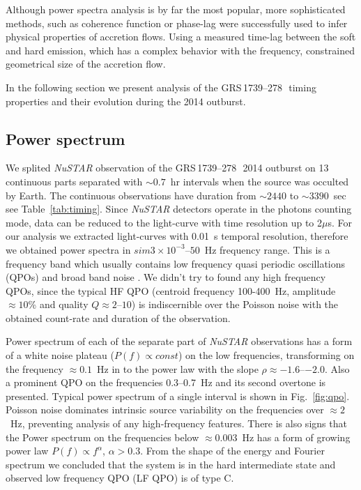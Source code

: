 \documentclass[a4paper,fleqn,usenatbib]{mnras}
\def\grs{{GRS\,1739--278\,}}
\begin{document}
Although power spectra analysis is by far the most popular, more sophisticated methods, such as coherence function or phase-lag were successfully used to infer physical properties of accretion flows. 
Using a measured time-lag between the soft and hard emission, which has a complex behavior with the frequency, \cite{1999ApJ...517..355N} constrained geometrical size of the accretion flow. 


In the following section we present analysis of the \grs\ timing properties and their evolution during the 2014 outburst.

\subsection{Power spectrum}

We splited {\it NuSTAR} observation of the \grs\ 2014 outburst on 13 continuous parts separated with $\sim0.7$~hr intervals when the source was occulted by Earth. 
The continuous observations have duration from $\sim2440$ to $\sim3390$~sec see Table~\ref{tab:timing}.
Since {\it NuSTAR} detectors operate in the photons counting mode, data can be reduced to the light-curve with time resolution up to 2$\mu$s.
For our analysis we extracted light-curves with 0.01~s temporal resolution, therefore we obtained power spectra in $sim3\times10^{-3}$--$50$~Hz frequency range.
This is a frequency band which usually contains low frequency quasi periodic oscillations (QPOs) and broad band noise \citep{1999ApJ...514..939W}.
We didn't try to found any high frequency QPOs, since the typical HF QPO (centroid frequency 100-400~Hz, amplitude $\approx10$\% and quality $Q\approx2$--$10$) is indiscernible over the Poisson noise with the obtained count-rate and duration of the observation.

Power spectrum of each of the separate part of {\it NuSTAR} observations has a form of a white noise plateau ($P(f)\propto const$) on the low frequencies, transforming on the frequency $\approx0.1$~Hz in to the power law with the slope $\rho\approx-1.6$--$-2.0$. 
Also a prominent QPO on the frequencies 0.3--0.7~Hz and its second overtone is presented. 
Typical power spectrum of a single interval is shown in Fig.~\ref{fig:qpo}.
Poisson noise dominates intrinsic source variability on the frequencies over $\approx2$~Hz, preventing analysis of any high-frequency features.
There is also signs that the Power spectrum on the frequencies below $\approx0.003$~Hz has a form of growing power law $P(f)\propto f^{\alpha}$, $\alpha > 0.3$.
From the shape of the energy and Fourier spectrum we concluded that the system is in the hard intermediate state and observed low frequency QPO (LF QPO) is of type C. 
\end{document}
